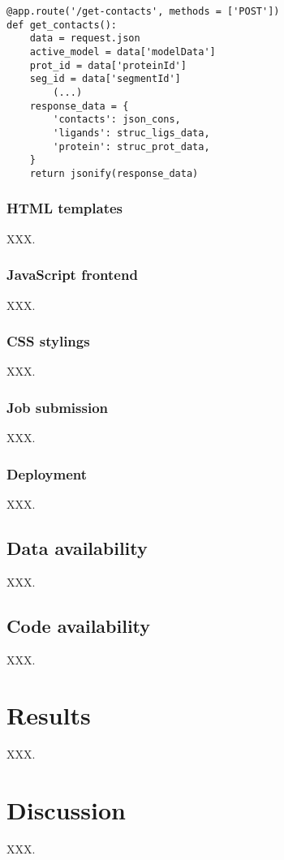 \begin{lstlisting}[language=MyPython, caption={[/get-contacts route]\textbf{/get-contacts route.} This Python code block shows an example of a Flask Web Application route that bla, bla, bla.}, label={get_contacts_route}]
@app.route('/get-contacts', methods = ['POST'])
def get_contacts():
    data = request.json
    active_model = data['modelData']
    prot_id = data['proteinId']
    seg_id = data['segmentId']
		(...)	
    response_data = {
        'contacts': json_cons,
        'ligands': struc_ligs_data,
        'protein': struc_prot_data,
    }
    return jsonify(response_data)
\end{lstlisting}

\subsubsection{HTML templates}

XXX.

\subsubsection{JavaScript frontend}

XXX.

\subsubsection{CSS stylings}

XXX.

\subsubsection{Job submission}

XXX.

\subsubsection{Deployment}

XXX.

\subsection{Data availability}

XXX.

\subsection{Code availability}

XXX.

\section{Results}

XXX.

\section{Discussion}

XXX.